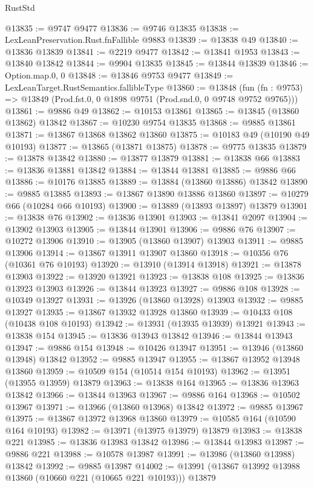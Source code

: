 \begin{lexlean}{RustStd}
\begin{coremodule}
@13835 := @9747 @9477
@13836 := @9746 @13835
@13838 := LexLeanPreservation.Rust.fnFallible @9883
@13839 := @13838 @49
@13840 := @13836 @13839
@13841 := @2219 @9477
@13842 := @13841 @1953
@13843 := @13840 @13842
@13844 := @9904 @13835
@13845 := @13844 @13839
@13846 := Option.map.{0, 0}
@13848 := @13846 @9753 @9477
@13849 := LexLeanTarget.RustSemantics.fallibleType
@13860 := @13848
    (fun (fn : @9753) => @13849 (Prod.fst.{0, 0} @1898 @9751 (Prod.snd.{0, 0} @9748 @9752 @9765)))
@13861 := @9886 @49
@13862 := @10153 @13861
@13865 := @13845 (@13860 @13862) @13842
@13867 := @10230 @9754 @13835
@13868 := @9885 @13861
@13871 := @13867 @13868 @13862 @13860
@13875 := @10183 @49 (@10190 @49 @10193)
@13877 := @13865 (@13871 @13875)
@13878 := @9775 @13835
@13879 := @13878 @13842
@13880 := @13877 @13879
@13881 := @13838 @66
@13883 := @13836 @13881 @13842
@13884 := @13844 @13881
@13885 := @9886 @66
@13886 := @10176 @13885
@13889 := @13884 (@13860 @13886) @13842
@13890 := @9885 @13885
@13893 := @13867 @13890 @13886 @13860
@13897 := @10279 @66 (@10284 @66 @10193)
@13900 := @13889 (@13893 @13897) @13879
@13901 := @13838 @76
@13902 := @13836 @13901
@13903 := @13841 @2097
@13904 := @13902 @13903
@13905 := @13844 @13901
@13906 := @9886 @76
@13907 := @10272 @13906
@13910 := @13905 (@13860 @13907) @13903
@13911 := @9885 @13906
@13914 := @13867 @13911 @13907 @13860
@13918 := @10356 @76 (@10361 @76 @10193)
@13920 := @13910 (@13914 @13918)
@13921 := @13878 @13903
@13922 := @13920 @13921
@13923 := @13838 @108
@13925 := @13836 @13923 @13903
@13926 := @13844 @13923
@13927 := @9886 @108
@13928 := @10349 @13927
@13931 := @13926 (@13860 @13928) @13903
@13932 := @9885 @13927
@13935 := @13867 @13932 @13928 @13860
@13939 := @10433 @108 (@10438 @108 @10193)
@13942 := @13931 (@13935 @13939) @13921
@13943 := @13838 @154
@13945 := @13836 @13943 @13842
@13946 := @13844 @13943
@13947 := @9886 @154
@13948 := @10426 @13947
@13951 := @13946 (@13860 @13948) @13842
@13952 := @9885 @13947
@13955 := @13867 @13952 @13948 @13860
@13959 := @10509 @154 (@10514 @154 @10193)
@13962 := @13951 (@13955 @13959) @13879
@13963 := @13838 @164
@13965 := @13836 @13963 @13842
@13966 := @13844 @13963
@13967 := @9886 @164
@13968 := @10502 @13967
@13971 := @13966 (@13860 @13968) @13842
@13972 := @9885 @13967
@13975 := @13867 @13972 @13968 @13860
@13979 := @10585 @164 (@10590 @164 @10193)
@13982 := @13971 (@13975 @13979) @13879
@13983 := @13838 @221
@13985 := @13836 @13983 @13842
@13986 := @13844 @13983
@13987 := @9886 @221
@13988 := @10578 @13987
@13991 := @13986 (@13860 @13988) @13842
@13992 := @9885 @13987
@14002 := @13991 (@13867 @13992 @13988 @13860 (@10660 @221 (@10665 @221 @10193))) @13879

\end{coremodule}
\end{lexlean}
